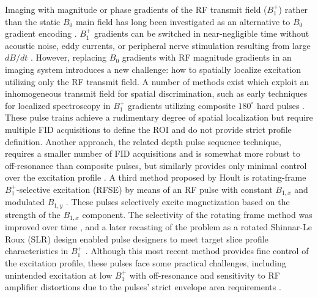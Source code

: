 \documentclass[a4paper,12pt]{article}
\begin{document}
\par Imaging with magnitude or phase gradients of the RF transmit field ($B_1^+$) rather than the static $B_0$ main field has long been investigated as an alternative to $B_0$ gradient encoding \cite{Hoult1979RotatingZeugmatography,Sharp2010MRIGradients,Kartausch2014SpatialEffect, Torres2021B1-gradientbasedEchoes}. 
$B_1^+$ gradients can be switched in near-negligible time without acoustic noise, eddy currents, 
or peripheral nerve stimulation resulting from large $dB/dt$ \cite{Canet1997RadiofrequencyExperiments}. 
However, replacing $B_0$ gradients with RF magnitude gradients in an imaging system introduces a new challenge: 
how to spatially localize excitation utilizing only the RF transmit field. 
A number of methods exist which exploit an inhomogeneous transmit field for spatial discrimination, 
such as early techniques for localized spectroscopy in $B_1^+$ gradients utilizing composite $180^\circ$ hard pulses \cite{Tycko1984SpatialInversion, Shaka1984SpatiallyPulses}. 
These pulse trains achieve a rudimentary degree of spatial localization but require multiple FID acquisitions to define the ROI and do not provide strict profile definition. 
Another approach, the related depth pulse sequence technique, 
requires a smaller number of FID acquisitions and is somewhat more robust to off-resonance than composite pulses, 
but similarly provides only minimal control over the excitation profile \cite{Bendall1983DepthCoils}. 
A third method proposed by Hoult is rotating-frame $B_1^+$-selective excitation (RFSE) 
by means of an RF pulse with constant $B_{1,x}$ and modulated $B_{1,y}$ \cite{Hoult1980NMRPulses}. 
These pulses selectively excite magnetization based on the strength of the $B_{1,x}$ component. 
The selectivity of the rotating frame method was improved over time \cite{Karczmar1988ShapedSimulations,Maffei1991SliceCoil, Hedges1988TheResults}, 
and a later recasting of the problem as a rotated Shinnar-Le Roux (SLR) design enabled 
pulse designers to meet target slice profile characteristics in $B_1^+$ \cite{Grissom2014B1+-selectiveAlgorithm}. 
Although this most recent method provides fine control of the excitation profile, 
these pulses face some practical challenges, 
including unintended excitation at low $B_1^+$ with off-resonance and sensitivity to RF amplifier distortions due to the pulses' strict envelope area requirements \cite{Grissom2014B1+-selectiveAlgorithm}. 
\end{document}
